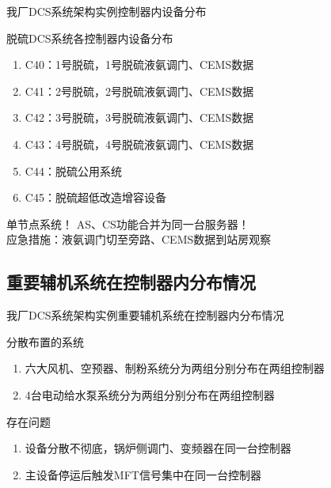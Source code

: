 \documentclass[12pt,hyperref={CJKbookmarks=true}]{beamer} %
\begin{document}
\begin{frame}{我厂DCS系统架构实例}{控制器内设备分布}
\begin{block}{\heiti 脱硫DCS系统各控制器内设备分布}
			\begin{enumerate}
				\item  C40：1号脱硫，1号脱硫液氨调门、CEMS数据
				
				\item   C41：2号脱硫，2号脱硫液氨调门、CEMS数据
				
				\item  C42：3号脱硫，3号脱硫液氨调门、CEMS数据

				\item  C43：4号脱硫，4号脱硫液氨调门、CEMS数据

				\item  C44：脱硫公用系统	

				\item  C45：脱硫超低改造增容设备	

		\end{enumerate}
		\end{block}
\pause
\begin{alertblock}{\heiti 单节点系统！}
			AS、CS功能合并为同一台服务器！\\应急措施：液氨调门切至旁路、CEMS数据到站房观察
		\end{alertblock}
\end{frame}
\subsection{重要辅机系统在控制器内分布情况}
\begin{frame}{我厂DCS系统架构实例}{重要辅机系统在控制器内分布情况}
\begin{block}{\heiti 分散布置的系统}
			\begin{enumerate}

				\item  六大风机、空预器、制粉系统分为两组分别分布在两组控制器
				
				\item   4台电动给水泵系统分为两组分别分布在两组控制器
		\end{enumerate}
		\end{block}
\pause
\begin{alertblock}{\heiti 存在问题}
			\begin{enumerate}
				\item  设备分散不彻底，锅炉侧调门、变频器在同一台控制器
				
				\item  主设备停运后触发MFT信号集中在同一台控制器
		\end{enumerate}
		\end{alertblock}
\end{frame}
\end{document}

